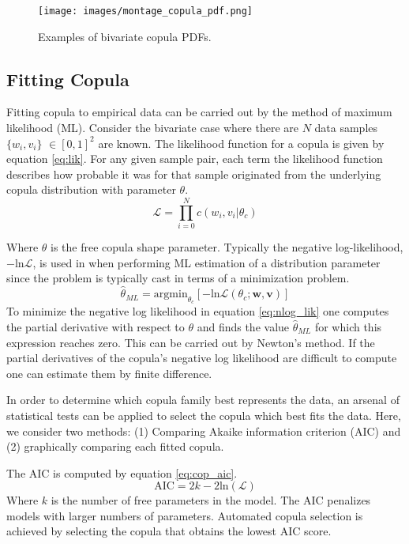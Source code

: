 \begin{figure}[!htbp]
	\centering
	\texttt{[image: images/montage\_copula\_pdf.png]}
	\caption{Examples of bivariate copula PDFs.}
	\label{fig:montage_cop}
\end{figure}

\subsection{Fitting Copula}
\label{sec:fitting_copula}

Fitting copula to empirical data can be carried out by the method of maximum likelihood (ML).  Consider the bivariate case where there are $N$ data samples $\{w_i, v_i\}$ $\in [0,1]^2$ are known. The likelihood function for a copula is given by equation \ref{eq:lik}.  For any given sample pair, each term the likelihood function describes how probable it was for that sample originated from the underlying copula distribution with parameter $\theta$.
\begin{equation}
\mathcal{L}= \prod_{i=0}^N c(w_i, v_i|\theta_c)
\label{eq:lik}
\end{equation}

Where $\theta$ is the free copula shape parameter.
Typically the negative log-likelihood, $-\mathrm{ln}\mathcal{L}$, is used in when performing ML estimation of a distribution parameter since the problem is typically cast in terms of a minimization problem.  
\begin{equation}
\hat \theta_{ML} = \mathrm{argmin}_{\theta_c}[-\mathrm{ln}\mathcal{L}(\theta_{c} ; \mathbf w, \mathbf v)]
\label{eq:nlog_lik}
\end{equation}
To minimize the negative log likelihood in equation \ref{eq:nlog_lik}  one computes the partial derivative with respect to $\theta$ and finds the value $\hat \theta_{ML}$ for which this expression reaches zero.  This can be carried out by Newton's method.  If the partial derivatives of the copula's negative log likelihood are difficult to compute one can estimate them by finite difference. 

In order to determine which copula family best represents the data, an arsenal of statistical tests can be applied to select the copula which best fits the data.  Here, we consider two methods:  (1) Comparing Akaike information criterion (AIC) and (2) graphically comparing each fitted copula.  

The AIC is computed by equation \ref{eq:cop_aic}.
\begin{equation}
\mathrm{AIC} = 2k - 2\mathrm{ln}(\mathcal{L})
\label{eq:cop_aic}
\end{equation}
Where $k$ is the number of free parameters in the model.  The AIC penalizes models with larger numbers of parameters. 
Automated copula selection is achieved by selecting the copula that obtains the lowest AIC score.

